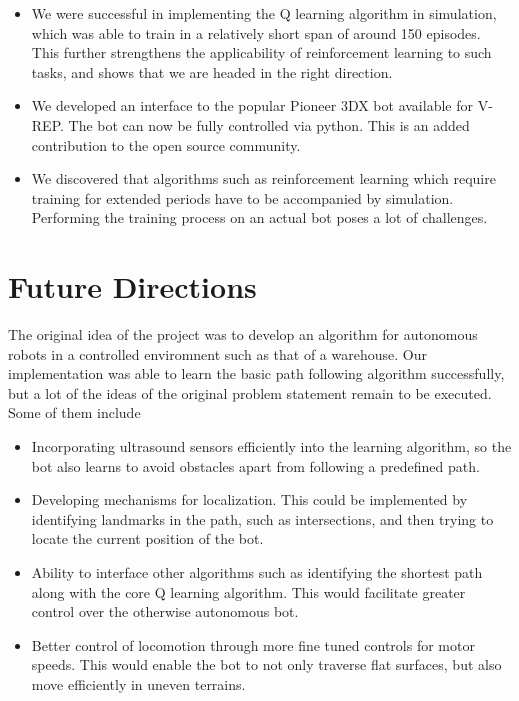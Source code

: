 \documentclass[12pt]{extreport}
\theoremstyle{plain}
\theoremstyle{definition}
\begin{document}
\begin{itemize}
    \item We were successful in implementing the Q learning algorithm in simulation, which was able to train in a relatively short span of around 150 episodes. This further strengthens the applicability of reinforcement learning to such tasks, and shows that we are headed in the right direction.
    \item We developed an interface to the popular Pioneer 3DX bot available for V-REP. The bot can now be fully controlled via python. This is an added contribution to the open source community.
    \item We discovered that algorithms such as reinforcement learning which require training for extended periods have to be accompanied by simulation. Performing the training process on an actual bot poses a lot of challenges.

\end{itemize}

\chapter{Future Directions}

The original idea of the project was to develop an algorithm for autonomous robots in a controlled enviromnent such as that of a warehouse. Our implementation was able to learn the basic path following algorithm successfully, but a lot of the ideas of the original problem statement remain to be executed. Some of them include

\begin{itemize}
    \item Incorporating ultrasound sensors efficiently into the learning algorithm, so the bot also learns to avoid obstacles apart from following a predefined path.
    \item Developing mechanisms for localization. This could be implemented by identifying landmarks in the path, such as intersections, and then trying to locate the current position of the bot.
    \item Ability to interface other algorithms such as identifying the shortest path along with the core Q learning algorithm. This would facilitate greater control over the otherwise autonomous bot.
    \item Better control of locomotion through more fine tuned controls for motor speeds. This would enable the bot to not only traverse flat surfaces, but also move efficiently in uneven terrains.
\end{itemize}




\end{document}
